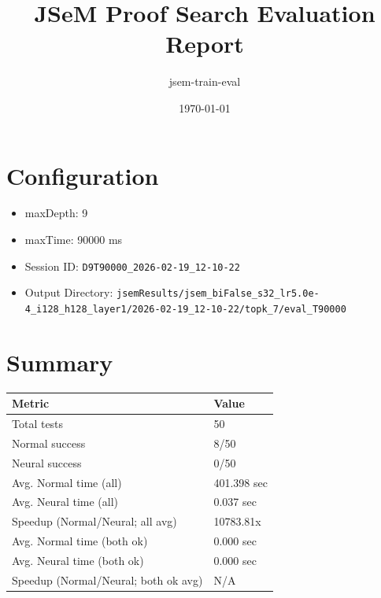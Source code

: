 \documentclass[a4paper,10pt]{article}
\title{JSeM Proof Search Evaluation Report}
\author{jsem-train-eval}
\date{\today}
\begin{document}
\maketitle

\section{Configuration}
\begin{itemize}
\item maxDepth: 9
\item maxTime: 90000 ms
\item Session ID: \texttt{D9T90000\_2026-02-19\_12-10-22}
\item Output Directory: \texttt{jsemResults/jsem\_biFalse\_s32\_lr5.0e-4\_i128\_h128\_layer1/2026-02-19\_12-10-22/topk\_7/eval\_T90000}
\end{itemize}

\section{Summary}
\begin{tabular}{ll}
\toprule
\textbf{Metric} & \textbf{Value} \\
\midrule
Total tests & 50 \\
Normal success & 8/50 \\
Neural success & 0/50 \\
\midrule
Avg. Normal time (all) & 401.398 sec \\
Avg. Neural time (all) & 0.037 sec \\
Speedup (Normal/Neural; all avg) & 10783.81x \\
Avg. Normal time (both ok) & 0.000 sec \\
Avg. Neural time (both ok) & 0.000 sec \\
Speedup (Normal/Neural; both ok avg) & N/A \\
\bottomrule
\end{tabular}
\end{document}
